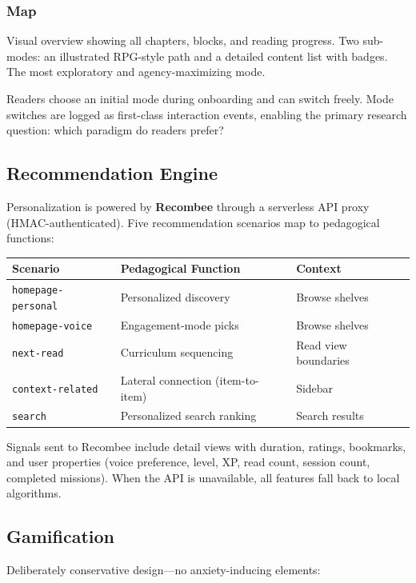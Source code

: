 \documentclass[11pt,a4paper]{article}
\begin{document}
\subsubsection{Map} Visual overview showing all chapters, blocks, and reading progress. Two sub-modes: an illustrated RPG-style path and a detailed content list with badges. The most exploratory and agency-maximizing mode.

Readers choose an initial mode during onboarding and can switch freely. Mode switches are logged as first-class interaction events, enabling the primary research question: which paradigm do readers prefer?

\subsection{Recommendation Engine}\label{sec:recsys}

Personalization is powered by \textbf{Recombee} through a serverless API proxy (HMAC-authenticated). Five recommendation scenarios map to pedagogical functions:

\begin{center}
\small
\begin{tabular}{@{}lll@{}}
\toprule
Scenario & Pedagogical Function & Context \\
\midrule
\texttt{homepage-personal} & Personalized discovery & Browse shelves \\
\texttt{homepage-voice} & Engagement-mode picks & Browse shelves \\
\texttt{next-read} & Curriculum sequencing & Read view boundaries \\
\texttt{context-related} & Lateral connection (item-to-item) & Sidebar \\
\texttt{search} & Personalized search ranking & Search results \\
\bottomrule
\end{tabular}
\end{center}

Signals sent to Recombee include detail views with duration, ratings, bookmarks, and user properties (voice preference, level, XP, read count, session count, completed missions). When the API is unavailable, all features fall back to local algorithms.

\subsection{Gamification}

Deliberately conservative design---no anxiety-inducing elements:
\end{document}
